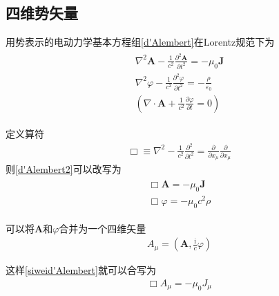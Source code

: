 \documentclass[main.tex]{subfiles}
\begin{document}
\subsection{四维势矢量}
用势表示的电动力学基本方程组\ref{d'Alembert}在Lorentz规范下为
\begin{align}
    \label{d'Alembert2}\begin{array}{c}
    \nabla ^2 \boldsymbol{A} - \displaystyle \frac{1}{c^2}\frac{\partial ^2 \boldsymbol{A}}{\partial t^2} = -\mu _0 \boldsymbol{J}\\
    \nabla ^2 \varphi  - \displaystyle \frac{1}{c^2}\frac{\partial ^2 \varphi }{\partial t^2} = -\frac{\rho}{\varepsilon _0}\\
    \left(\nabla \cdot \boldsymbol{A} +\displaystyle \frac{1}{c^2}\frac{\partial \varphi }{\partial  t}  = 0\right)
    \end{array}    
\end{align}

定义算符
\begin{align}
    \Box \equiv \nabla ^2 -\frac{1}{c^2}\frac{\partial ^2}{\partial t^2}  = \frac{\partial }{\partial  x_{\mu}} \frac{\partial }{\partial  x_{\mu}} 
\end{align}
则\ref{d'Alembert2}可以改写为
\begin{align}
    \begin{array}{c}
        \label{siweid'Alembert}\Box \boldsymbol{A} = -\mu _0\boldsymbol{J}\\
         \Box \varphi = -\mu _0 c^2 \rho
    \end{array}
\end{align}

可以将$\boldsymbol{A}$和$\varphi$合并为一个四维矢量
\begin{align}
    A_{\mu} = \left(\boldsymbol{A},\frac{\mathrm{i}}{c}\varphi \right)
\end{align}

这样\ref{siweid'Alembert}就可以合写为
\begin{align}
    \Box A_{\mu} = -\mu_0J_{\mu}
\end{align}
\end{document}
